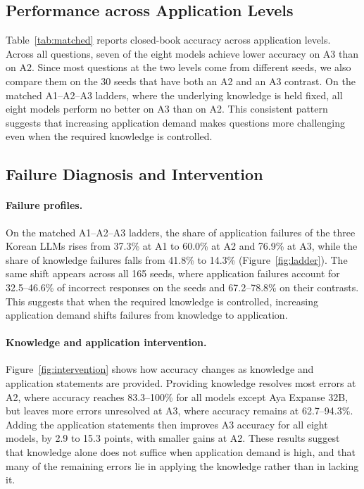 \subsection{Performance across Application Levels}
\label{sec:diagnostic_performance}

Table~\ref{tab:matched} reports closed-book accuracy across application levels.
Across all questions, seven of the eight models achieve lower accuracy on A3 than on A2.
Since most questions at the two levels come from different seeds, we also compare them on the 30 seeds that have both an A2 and an A3 contrast.
On the matched A1--A2--A3 ladders, where the underlying knowledge is held fixed, all eight models perform no better on A3 than on A2.
This consistent pattern suggests that increasing application demand makes questions more challenging even when the required knowledge is controlled.

\subsection{Failure Diagnosis and Intervention}
\label{sec:diagnostic_failure}

\paragraph{Failure profiles.}
On the matched A1--A2--A3 ladders, the share of application failures of the three Korean LLMs rises from 37.3\% at A1 to 60.0\% at A2 and 76.9\% at A3, while the share of knowledge failures falls from 41.8\% to 14.3\% (Figure~\ref{fig:ladder}).
The same shift appears across all 165 seeds, where application failures account for 32.5--46.6\% of incorrect responses on the seeds and 67.2--78.8\% on their contrasts.
This suggests that when the required knowledge is controlled, increasing application demand shifts failures from knowledge to application.

\paragraph{Knowledge and application intervention.}
Figure~\ref{fig:intervention} shows how accuracy changes as knowledge and application statements are provided.
Providing knowledge resolves most errors at A2, where accuracy reaches 83.3--100\% for all models except Aya Expanse 32B, but leaves more errors unresolved at A3, where accuracy remains at 62.7--94.3\%.
Adding the application statements then improves A3 accuracy for all eight models, by 2.9 to 15.3 points, with smaller gains at A2.
These results suggest that knowledge alone does not suffice when application demand is high, and that many of the remaining errors lie in applying the knowledge rather than in lacking it.